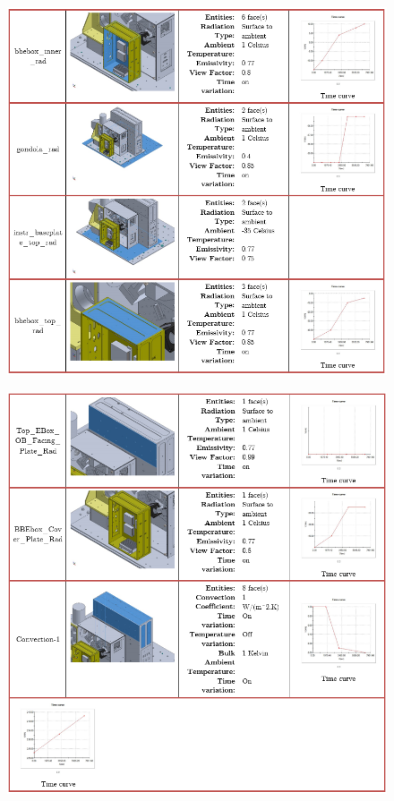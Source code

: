 \begin{figure}
    \centering
    \includegraphics[width=\textwidth]{thermal_load_images/ascent_pt2_TL_images/ascesnt_pt2_9.PNG}
\end{figure}

\begin{figure}
    \centering
    \includegraphics[width=\textwidth]{thermal_load_images/ascent_pt2_TL_images/ascesnt_pt2_10.PNG}
\end{figure}

